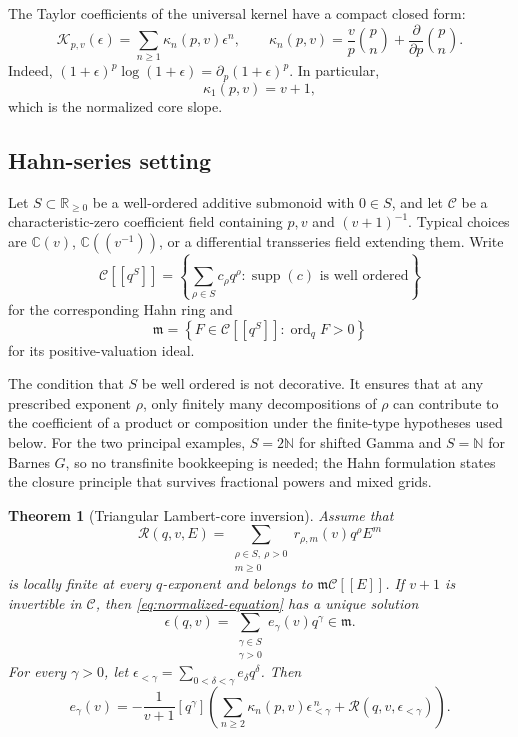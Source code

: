 \documentclass[11pt,oneside]{article}
\theoremstyle{plain}
\newtheorem{theorem}{Theorem}[section]
\theoremstyle{definition}
\theoremstyle{remark}
\newcommand{\C}{\mathbb{C}}
\newcommand{\R}{\mathbb{R}}
\newcommand{\N}{\mathbb{N}}
\newcommand{\Rcal}{\mathcal{R}}
\newcommand{\Kcal}{\mathcal{K}}
\newcommand{\mideal}{\mathfrak{m}}
\newcommand{\coeff}[2]{\left[#1^{#2}\right]}
\DeclareMathOperator{\ord}{ord}
\begin{document}
The Taylor coefficients of the universal kernel have a compact closed form:
\begin{equation}
 \Kcal_{p,v}(\epsilon)=\sum_{n\ge1}\kappa_n(p,v)\epsilon^n,
 \qquad
 \kappa_n(p,v)=\frac{v}{p}\binom pn+
 \frac{\partial}{\partial p}\binom pn.
 \label{eq:kappa-general}
\end{equation}
Indeed, \((1+\epsilon)^p\log(1+\epsilon)=\partial_p(1+\epsilon)^p\).
In particular,
\begin{equation}
 \kappa_1(p,v)=v+1,
 \label{eq:kernel-linear}
\end{equation}
which is the normalized core slope.

\subsection{Hahn-series setting}

Let \(S\subset\R_{\ge0}\) be a well-ordered additive submonoid with
\(0\in S\), and let \(\mathscr C\) be a characteristic-zero coefficient
field containing \(p,v\) and \((v+1)^{-1}\).  Typical choices are
\(\C(v)\), \(\C((v^{-1}))\), or a differential transseries field extending
them.  Write
\[
 \mathscr C[[q^S]]
 =\left\{\sum_{\rho\in S}c_\rho q^\rho:
   \operatorname{supp}(c)\text{ is well ordered}\right\}
\]
for the corresponding Hahn ring and
\[
 \mideal=\left\{F\in\mathscr C[[q^S]]:\ord_qF>0\right\}
\]
for its positive-valuation ideal.

The condition that \(S\) be well ordered is not decorative.  It ensures that
at any prescribed exponent \(\rho\), only finitely many decompositions of
\(\rho\) can contribute to the coefficient of a product or composition under
the finite-type hypotheses used below.  For the two principal examples,
\(S=2\N\) for shifted Gamma and \(S=\N\) for Barnes \(G\), so no transfinite
bookkeeping is needed; the Hahn formulation states the closure principle that
survives fractional powers and mixed grids.

\begin{theorem}[Triangular Lambert-core inversion]
\label{thm:triangular}
Assume that
\begin{equation}
 \Rcal(q,v,E)=
 \sum_{\substack{\rho\in S,\ \rho>0\\m\ge0}}
 r_{\rho,m}(v)q^\rho E^m
 \label{eq:R-hahn}
\end{equation}
is locally finite at every \(q\)-exponent and belongs to
\(\mideal\mathscr C[[E]]\).  If \(v+1\) is invertible in \(\mathscr C\), then
\cref{eq:normalized-equation} has a unique solution
\begin{equation}
 \epsilon(q,v)=\sum_{\substack{\gamma\in S\\\gamma>0}}
 e_\gamma(v)q^\gamma\in\mideal.
 \label{eq:epsilon-hahn}
\end{equation}
For every \(\gamma>0\), let
\(\epsilon_{<\gamma}=\sum_{0<\delta<\gamma}e_\delta q^\delta\).  Then
\begin{equation}
 e_\gamma(v)=-\frac{1}{v+1}\coeff{q}{\gamma}
 \left(
   \sum_{n\ge2}\kappa_n(p,v)\epsilon_{<\gamma}^{\,n}
   +\Rcal(q,v,\epsilon_{<\gamma})
 \right).
 \label{eq:general-triangular-recurrence}
\end{equation}
\end{theorem}
\end{document}
